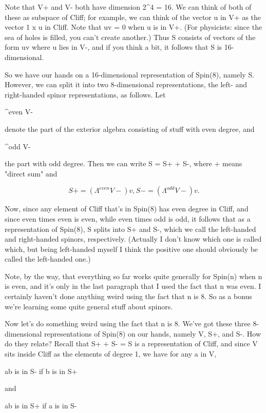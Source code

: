 Note that \Lambda  V+ and \Lambda  V- both have dimension 2^4 = 16.  We
can think of both of these as subspace of Cliff; for example, we can
think of the vector u in \Lambda  V+ as the vector 1 x u in Cliff.  Note
that uv = 0 when u is in \Lambda  V+.  (For physicists: since the sea of
holes is filled, you can't create another.)  Thus S consists of
vectors of the form uv where u lies in \Lambda  V-, and if you think a
bit, it follows that S is 16-dimensional.

So we have our hands on a 16-dimensional representation of Spin(8),
namely S.  However, we can split it into two 8-dimensional
representations, the left- and right-handed spinor representations, 
as follows.   Let 

\Lambda ^{even} V- 

denote the part of the exterior algebra consisting of stuff with
even degree, and 

\Lambda ^{odd} V- 

the part with odd degree.  Then we can write S = S+ + S-, where
+ means "direct sum" and


$$

S+ = (\Lambda ^{even} V-)v ,  S- = (\Lambda ^{odd} V-)v.
$$
    

Now, since any element of Cliff that's in Spin(8) has even degree
in Cliff, and since even times even is even, while even times odd
is odd, it follows that as a representation of Spin(8), S splits
into S+ and S-, which we call the left-handed and right-handed spinors,
respectively.  (Actually I don't know which one is called which, but
being left-handed myself I think the positive one should obviously be
called the left-handed one.)  

Note, by the way, that everything so far works quite generally for
Spin(n) when n is even, and it's only in the last paragraph that I
used the fact that n was even.  I certainly haven't done anything
weird using the fact that n is 8.  So as a bonus we're learning some
quite general stuff about spinors.

Now let's do something weird using the fact that n is 8.  We've got
these three 8-dimensional representations of Spin(8) on our hands,
namely V, S+, and S-.  How do they relate?  Recall that S+ + S- = S
is a representation of Cliff, and since V sits inside Cliff as the elements
of degree 1, we have for any a in V,

ab is in S- if b is in S+

and

ab is in S+ if a is in S-

